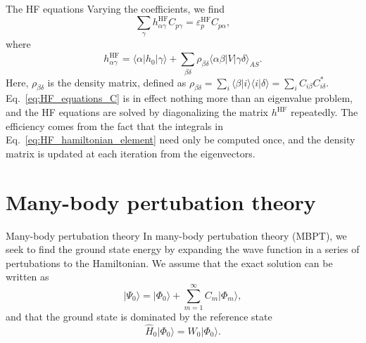 \documentclass[UKenglish,aspectratio=169]{beamer}
\begin{document}
\begin{frame}{The HF equations}
    Varying the coefficients, we find
    \begin{equation}\label{eq:HF_equations_C}
        \sum_{\gamma} h_{\alpha\gamma}^{\mathrm{HF}} C_{p \gamma}
        = \varepsilon_p^{\mathrm{HF}} C_{p \alpha},
    \end{equation}
    where
    \begin{equation}\label{eq:HF_hamiltonian_element}
        h_{\alpha \gamma}^\mathrm{HF}
        = \langle \alpha \vert \hat{h}_0 \vert \gamma \rangle
        + \sum_{\beta\delta} \rho_{\beta\delta} \langle \alpha\beta \vert V \vert \gamma\delta \rangle_{AS}.
    \end{equation}
    Here, $\rho_{\beta\delta}$ is the density matrix, defined as
    $\rho_{\beta\delta} = \sum_{i} \langle \beta \vert i \rangle
    \langle i \vert \delta \rangle = \sum_{i} C_{i\beta} C_{i\delta}^*$.
    Eq.~\eqref{eq:HF_equations_C} is in effect nothing more than an
    eigenvalue problem, and the HF equations are solved by
    diagonalizing the matrix $h^\mathrm{HF}$ repeatedly.
    The efficiency comes from the fact that the integrals in
    Eq.~\eqref{eq:HF_hamiltonian_element} need only be computed once,
    and the density matrix is updated at each iteration from the eigenvectors.
\end{frame}

\section{Many-body pertubation theory}

\begin{frame}{Many-body pertubation theory}
    In many-body pertubation theory (MBPT), we seek to find the
    ground state energy by expanding the wave function in a series of
    pertubations to the Hamiltonian.
    We assume that the exact solution can be written as
    \begin{equation}
        \lvert \Psi_0 \rangle
        = \lvert \Phi_0 \rangle + \sum_{m = 1}^\infty C_m \lvert \Phi_m \rangle,
    \end{equation}
    and that the ground state is dominated by the reference state
    \begin{equation}
        \hat{H}_0 \lvert \Phi_0 \rangle = W_0 \lvert \Phi_0 \rangle.
    \end{equation}
\end{frame}
\end{document}
